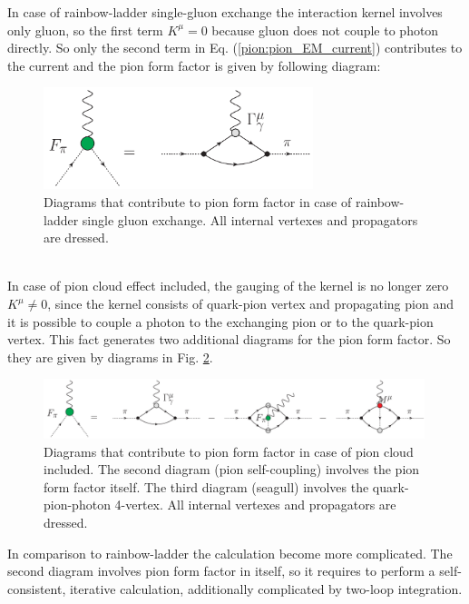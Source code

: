 In case of rainbow-ladder single-gluon exchange the interaction kernel involves only gluon, so the first term $K^{\mu}=0$ because gluon does not couple to photon directly. So only the second term in Eq. (\ref{pion:pion_EM_current}) contributes to the current and the pion form factor is given by following diagram:
\begin{figure}[h]
\centering
\includegraphics[width=0.7\textwidth]{figures/FF_RL}
\caption{\label{fig:FF_RL}\footnotesize Diagrams that contribute to pion form factor in case of rainbow-ladder single gluon exchange. All internal vertexes and propagators are dressed.}
\end{figure} \\

In case of pion cloud effect included, the gauging of the kernel is no longer zero $K^{\mu}\neq0$, since the kernel consists of quark-pion vertex and propagating pion and it is possible to couple a photon to the exchanging pion or to the quark-pion vertex. This fact generates two additional diagrams for the pion form factor. So they are given by diagrams in Fig. \ref{fig:FF_with_pi}. \\
\begin{figure}[h]
\centering
\includegraphics[width=0.99\textwidth]{figures/FF_with_pi}
\caption{\label{fig:FF_with_pi}\footnotesize Diagrams that contribute to pion form factor in case of pion cloud included. The second diagram (pion self-coupling) involves the pion form factor itself. The third diagram (seagull) involves the quark-pion-photon 4-vertex. All internal vertexes and propagators are dressed.}
\end{figure}
In comparison to rainbow-ladder the calculation become more complicated. The second diagram involves pion form factor in itself, so it requires to perform a self-consistent, iterative calculation, additionally complicated by two-loop integration. \\

